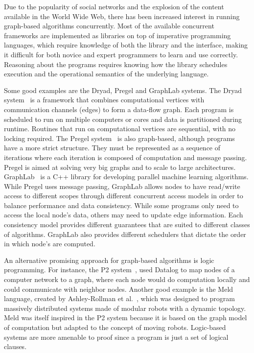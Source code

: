
Due to the popularity of social networks and the explosion of the content available in the World Wide Web, there has been
increased interest in running graph-based algorithms concurrently. Most of the available concurrent frameworks are implemented as libraries on top
of imperative programming languages, which require knowledge of both the library and the interface, making it difficult
for both novice and expert programmers to learn and use correctly.
Reasoning about the programs requires knowing how
the library schedules execution and the operational semantics of the underlying language.

Some good examples are the Dryad, Pregel and GraphLab systems.
The Dryad system~\cite{Isard:2007:DDD:1272996.1273005} is a framework that combines computational vertices
with communication channels (edges) to form a data-flow graph. Each program is scheduled to
run on multiple computers or cores and data is partitioned during runtime. Routines that run on computational vertices
are sequential, with no locking required.
The Pregel system~\cite{Malewicz:2010:PSL:1807167.1807184} is also graph-based, although programs have a more strict
structure. They must be represented as a sequence of iterations where each iteration is composed of computation and message passing.
Pregel is aimed at solving very big graphs
and to scale to large architectures. GraphLab~\cite{GraphLab2010} is a C++ library for developing parallel machine learning algorithms. While
Pregel uses message passing, GraphLab allows nodes to have read/write access to different scopes through different concurrent access models in order to balance performance and data consistency. While some programs only need to access the local node's data, others may need to update edge information. Each consistency model provides different guarantees that are suited to different classes of algorithms. GraphLab also provides different schedulers that dictate the order in which node's are computed.

An alternative promising approach for graph-based algorithms 
is logic programming. For instance, the P2 system~\cite{Loo-condie-garofalakis-p2}, used Datalog to map nodes of a computer network
to a graph, where each node would do computation locally and could communicate with neighbor nodes.
Another good example is the Meld language, created by
Ashley-Rollman et al.~\cite{ashley-rollman-derosa-iros07wksp,ashley-rollman-iclp09}, which was designed to
program massively distributed systems made of modular robots with a dynamic topology. Meld was itself inspired
in the P2 system because it is based on the graph model of computation but adapted to the concept of moving
robots.
Logic-based systems are more amenable to proof since a program is just a set of logical clauses.

